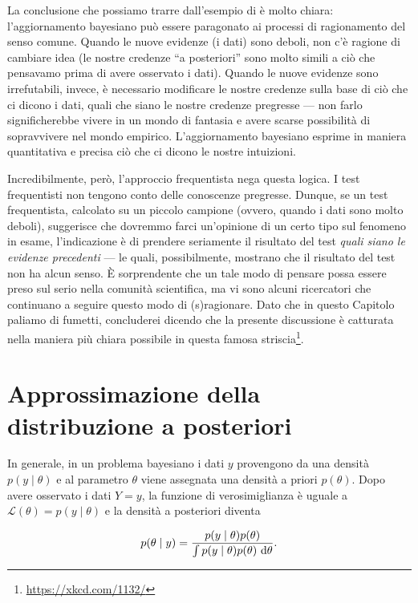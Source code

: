 \documentclass[
  11pt,
]{krantz}
\renewcommand{\href}[2]{#2\footnote{\url{#1}}}
\theoremstyle{definition}
\theoremstyle{definition}
\theoremstyle{definition}
\theoremstyle{definition}
\theoremstyle{remark}
\begin{document}
La conclusione che possiamo trarre dall'esempio di \citet{Johnson2022bayesrules} è molto chiara: l'aggiornamento bayesiano può essere paragonato ai processi di ragionamento del senso comune. Quando le nuove evidenze (i dati) sono deboli, non c'è ragione di cambiare idea (le nostre credenze ``a posteriori'' sono molto simili a ciò che pensavamo prima di avere osservato i dati). Quando le nuove evidenze sono irrefutabili, invece, è necessario modificare le nostre credenze sulla base di ciò che ci dicono i dati, quali che siano le nostre credenze pregresse --- non farlo significherebbe vivere in un mondo di fantasia e avere scarse possibilità di sopravvivere nel mondo empirico. L'aggiornamento bayesiano esprime in maniera quantitativa e precisa ciò che ci dicono le nostre intuizioni.

Incredibilmente, però, l'approccio frequentista nega questa logica. I test frequentisti non tengono conto delle conoscenze pregresse. Dunque, se un test frequentista, calcolato su un piccolo campione (ovvero, quando i dati sono molto deboli), suggerisce che dovremmo farci un'opinione di un certo tipo sul fenomeno in esame, l'indicazione è di prendere seriamente il risultato del test \emph{quali siano le evidenze precedenti} --- le quali, possibilmente, mostrano che il risultato del test non ha alcun senso. È sorprendente che un tale modo di pensare possa essere preso sul serio nella comunità scientifica, ma vi sono alcuni ricercatori che continuano a seguire questo modo di (s)ragionare. Dato che in questo Capitolo paliamo di fumetti, concluderei dicendo che la presente discussione è catturata nella maniera più chiara possibile in questa famosa \href{https://xkcd.com/1132/}{striscia}.

\hypertarget{ch:metropolis}{%
\chapter{Approssimazione della distribuzione a posteriori}\label{ch:metropolis}}

In generale, in un problema bayesiano i dati \(y\) provengono da una densità \(p(y \mid \theta)\) e al parametro \(\theta\) viene assegnata una densità a priori \(p(\theta)\). Dopo avere osservato i dati \(Y = y\), la funzione di verosimiglianza è uguale a \(\mathcal{L}(\theta) = p(y \mid \theta)\) e la densità a posteriori diventa

\begin{equation}
p(\theta \mid y) = \frac{p(y \mid \theta) p(\theta)}{\int p(y \mid \theta) p(\theta) \,\operatorname {d}\! \theta}. \notag
\end{equation}
\end{document}
